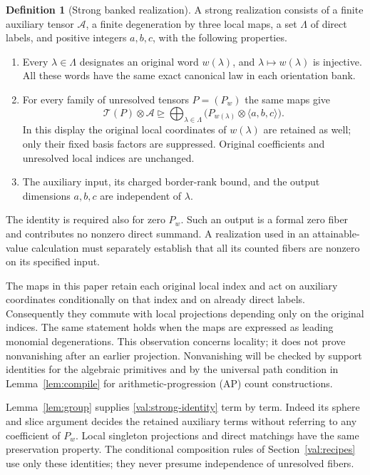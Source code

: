 \documentclass[11pt]{article}
\numberwithin{equation}{section}
\theoremstyle{definition}
\newtheorem{definition}[theorem]{Definition}
\theoremstyle{remark}
\begin{document}
\begin{definition}[Strong banked realization]
\label{def:strong}
A strong realization consists of a finite auxiliary tensor $\mathcal A$, a
finite degeneration by three local maps, a set $\Lambda$ of direct labels,
and positive integers $a,b,c$, with the following properties.
\begin{enumerate}[label=\textup{(\roman*)}]
\item Every $\lambda\in\Lambda$ designates an original word $w(\lambda)$,
      and $\lambda\mapsto w(\lambda)$ is injective.  All these words have
      the same exact canonical law in each orientation bank.
\item For every family of unresolved tensors $P=(P_w)$ the same maps give
\begin{equation}
\mathcal T(P)\otimes\mathcal A
 \unrhd
 \bigoplus_{\lambda\in\Lambda}
 \bigl(P_{w(\lambda)}\otimes\langle a,b,c\rangle\bigr).
\label{val:strong-identity}
\end{equation}
      In this display the original local coordinates of $w(\lambda)$ are
      retained as well; only their fixed basis factors are suppressed.
      Original coefficients and unresolved local indices are unchanged.
\item The auxiliary input, its charged border-rank bound, and the output
      dimensions $a,b,c$ are independent of $\lambda$.
\end{enumerate}
The identity is required also for zero $P_w$.  Such an output is a formal
zero fiber and contributes no nonzero direct summand.  A realization used in
an attainable-value calculation must separately establish that all its
counted fibers are nonzero on its specified input.
\end{definition}

The maps in this paper retain each original local index and act on auxiliary
coordinates conditionally on that index and on already direct labels.
Consequently they commute with local projections depending only on the
original indices.  The same statement holds when the maps are expressed as
leading monomial degenerations.  This observation concerns locality; it does
not prove nonvanishing after an earlier projection.  Nonvanishing will be
checked by support identities for the algebraic primitives and by the
universal path condition in Lemma~\ref{lem:compile} for arithmetic-progression
(AP) count constructions.

Lemma~\ref{lem:group} supplies \eqref{val:strong-identity} term by term.
Indeed its sphere and slice argument decides the retained auxiliary terms
without referring to any coefficient of $P_w$.  Local singleton projections
and direct matchings have the same preservation property.  The conditional
composition rules of Section~\ref{val:recipes} use only these identities;
they never presume independence of unresolved fibers.
\end{document}
